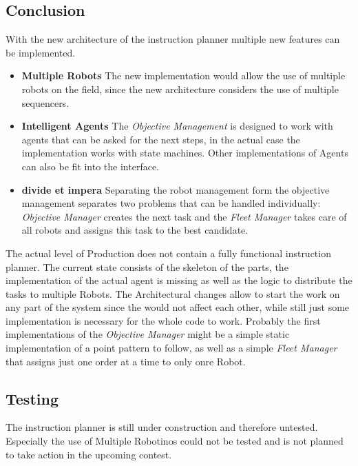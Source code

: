 \subsection{Conclusion}
With the new architecture of the instruction planner multiple new features can be implemented.
\begin{itemize}
    \item \textbf{Multiple Robots} The new implementation would allow the use of multiple robots on the field, since
    the new architecture considers the use of multiple sequencers.
    \item \textbf{Intelligent Agents} The \textit{Objective Management} is designed to work with agents that can be asked
    for the next steps, in the actual case the implementation works with state machines. Other implementations of Agents can
    also be fit into the interface.
    \item \textbf{divide et impera} Separating the robot management form the objective management separates two problems
    that can be handled individually: \textit{Objective Manager} creates the next task and the \textit{Fleet Manager} takes care
    of all robots and assigns this task to the best candidate.
\end{itemize}

The actual level of Production does not contain a fully functional instruction planner.
The current state consists of the skeleton of the parts, the implementation of the
actual agent is missing as well as the logic to distribute the tasks to multiple Robots.
The Architectural changes allow to start the work on any part of the system since the would not affect each other,
while still just some implementation is necessary for the whole code to work.
Probably the first implementations of the \textit{Objective Manager} might be a
simple static implementation of a point pattern to follow, as well as a simple \textit{Fleet Manager} that
assigns just one order at a time to only onre Robot.


\subsection{Testing}
The instruction planner is still under construction and therefore untested.
Especially the use of Multiple Robotinos could not be tested and is not planned to take action in the upcoming contest.

\newpage
